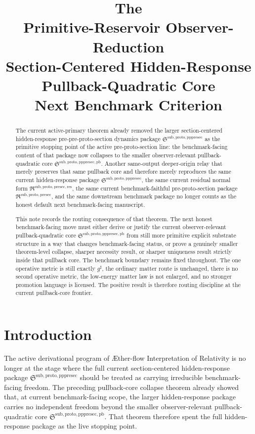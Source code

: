 \documentclass[11pt]{article}
\title{\textbf{The \TheoryName{}}\\[0.4em]
\large Primitive-Reservoir Observer-Reduction\\
\large Section-Centered Hidden-Response\\
\large Pullback-Quadratic Core\\
\large Next Benchmark Criterion}
\author{}
\date{}
\newcommand{\Aflow}{\AE{}ther-flow}
\newcommand{\TheoryName}{\Aflow{} Interpretation of Relativity}
\newcommand{\CompletedMetric}{g^{\sharp}}
\newcommand{\PreProtoSectionPackage}{\mathfrak R^{\mathrm{sub,proto,presec}}}
\newcommand{\PreProtoSectionResidualPackage}{\mathfrak R^{\mathrm{sub,proto,presec,res}}}
\newcommand{\PrePreProtoSectionPackage}{\mathfrak S^{\mathrm{sub,proto,pppresec}}}
\newcommand{\PrePreProtoSectionPullbackCore}{\mathfrak S^{\mathrm{sub,proto,pppresec,pb}}}
\begin{document}
\maketitle

\begin{abstract}
The current active-primary theorem already removed the larger section-centered hidden-response pre-pre-proto-section dynamics package \(\PrePreProtoSectionPackage\) as the primitive stopping point of the active pre-proto-section line: the benchmark-facing content of that package now collapses to the smaller observer-relevant pullback-quadratic core \(\PrePreProtoSectionPullbackCore\). Another same-output deeper-origin relay that merely preserves that same pullback core and therefore merely reproduces the same current hidden-response package \(\PrePreProtoSectionPackage\), the same current residual normal form \(\PreProtoSectionResidualPackage\), the same current benchmark-faithful pre-proto-section package \(\PreProtoSectionPackage\), and the same downstream benchmark package no longer counts as the honest default next benchmark-facing manuscript.

This note records the routing consequence of that theorem. The next honest benchmark-facing move must either derive or justify the current observer-relevant pullback-quadratic core \(\PrePreProtoSectionPullbackCore\) from still more primitive explicit substrate structure in a way that changes benchmark-facing status, or prove a genuinely smaller theorem-level collapse, sharper necessity result, or sharper uniqueness result strictly inside that pullback core. The benchmark boundary remains fixed throughout. The one operative metric is still exactly \(\CompletedMetric\), the ordinary matter route is unchanged, there is no second operative metric, the low-energy matter law is not enlarged, and no stronger promotion language is licensed. The positive result is therefore routing discipline at the current pullback-core frontier.
\end{abstract}

\section{Introduction}

The active derivational program of \TheoryName{} is no longer at the stage where the full current section-centered hidden-response package \(\PrePreProtoSectionPackage\) should be treated as carrying irreducible benchmark-facing freedom. The preceding pullback-core collapse theorem already showed that, at current benchmark-facing scope, the larger hidden-response package carries no independent freedom beyond the smaller observer-relevant pullback-quadratic core \(\PrePreProtoSectionPullbackCore\). That theorem therefore spent the full hidden-response package as the live stopping point.
\end{document}
